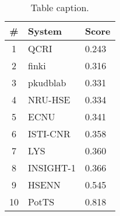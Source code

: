 \begin{table}[tbh]
\centering
\begin{small}
\renewcommand{\arraystretch}{1.0}%
\begin{tabular}{|c|l|l|}
\hline
   \bf \# & \bf System & \bf Score \\
\hline
1 & QCRI & 0.243 \\
2 & finki & 0.316 \\
3 & pkudblab & 0.331 \\
4 & NRU-HSE & 0.334 \\
5 & ECNU & 0.341 \\
6 & ISTI-CNR & 0.358 \\
7 & LYS & 0.360 \\
8 & INSIGHT-1 & 0.366 \\
9 & HSENN & 0.545 \\
10 & PotTS & 0.818 \\
\hline
\end{tabular}
\caption{Table caption.}
\label{table:results}
\end{small}
\end{table}
